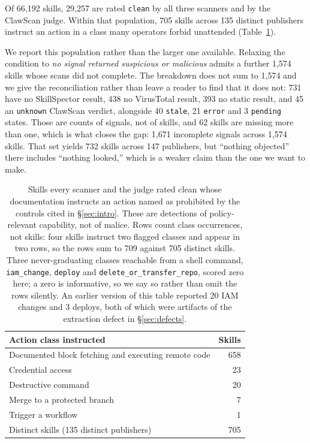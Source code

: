 \documentclass[10pt]{article}
\begin{document}
Of 66,192 skills, 29,257 are rated \texttt{clean} by all three scanners and by the
ClawScan judge. Within that population, 705 skills across 135 distinct publishers
instruct an action in a class many operators forbid unattended
(Table~\ref{tab:permission}).

We report this population rather than the larger one available. Relaxing the
condition to \emph{no signal returned suspicious or malicious} admits a further 1,574
skills whose scans did not complete. The breakdown does not sum to 1,574 and we give
the reconciliation rather than leave a reader to find that it does not: 731 have no
SkillSpector result, 438 no VirusTotal result, 393 no static result, and 45 an
\texttt{unknown} ClawScan verdict, alongside 40 \texttt{stale}, 21 \texttt{error} and
3 \texttt{pending} states. Those are counts of signals, not of skills, and 62 skills
are missing more than one, which is what closes the gap: 1{,}671 incomplete signals
across 1{,}574 skills. That set yields 732 skills across 147 publishers, but
``nothing objected'' there includes ``nothing looked,'' which is a weaker claim than
the one we want to make.

\begin{table}[H]
\centering
\begin{tabular}{lr}
\toprule
Action class instructed & Skills \\
\midrule
Documented block fetching and executing remote code & 658 \\
Credential access & 23 \\
Destructive command & 20 \\
Merge to a protected branch & 7 \\
Trigger a workflow & 1 \\
\midrule
Distinct skills (135 distinct publishers) & 705 \\
\bottomrule
\end{tabular}
\caption{Skills every scanner and the judge rated clean whose documentation instructs
an action named as prohibited by the controls cited in \S\ref{sec:intro}. These are
detections of policy-relevant capability, not of malice. Rows count class
occurrences, not skills: four skills instruct two flagged classes and appear in two
rows, so the rows sum to 709 against 705 distinct skills. Three never-graduating
classes reachable from a shell command, \texttt{iam\_change}, \texttt{deploy} and
\texttt{delete\_or\_transfer\_repo}, scored zero here; a zero is informative, so we
say so rather than omit the rows silently. An earlier version of this table reported
20 IAM changes and 3 deploys, both of which were artifacts of the extraction defect
in \S\ref{sec:defects}.}
\label{tab:permission}
\end{table}
\end{document}
